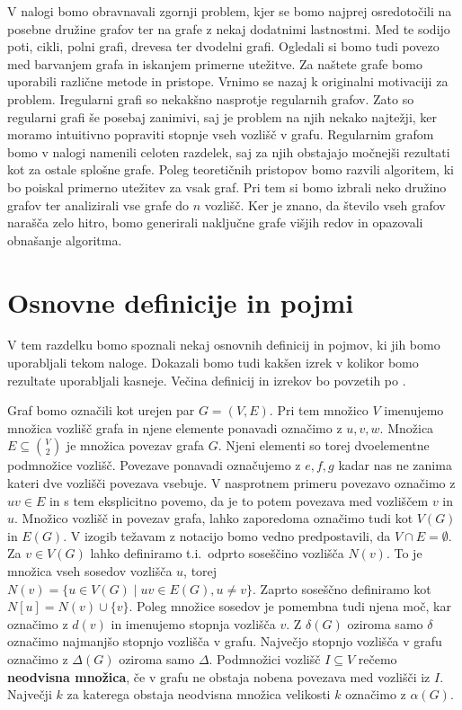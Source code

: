 \documentclass[12pt,a4paper,twoside]{article}
\theoremstyle{definition} %
\theoremstyle{plain} %
\numberwithin{equation}{section}  %
\begin{document}
V nalogi bomo obravnavali zgornji problem, kjer se bomo najprej osredotočili na posebne družine grafov ter na grafe z nekaj dodatnimi lastnostmi. Med te sodijo poti, cikli, polni grafi, drevesa ter dvodelni grafi. Ogledali si bomo tudi povezo med barvanjem grafa in iskanjem primerne utežitve. Za naštete grafe bomo uporabili različne metode in pristope. Vrnimo se nazaj k originalni motivaciji za problem. Iregularni grafi so nekakšno nasprotje regularnih grafov. Zato so regularni grafi še posebaj zanimivi, saj je problem na njih nekako najtežji, ker moramo intuitivno popraviti stopnje vseh vozlišč v grafu. Regularnim grafom bomo v nalogi namenili celoten razdelek, saj za njih obstajajo močnejši rezultati kot za ostale splošne grafe. Poleg teoretičnih pristopov bomo razvili algoritem, ki bo poiskal primerno utežitev za vsak graf. Pri tem si bomo izbrali neko družino grafov ter analizirali vse grafe do $n$ vozlišč. Ker je znano, da število vseh grafov narašča zelo hitro, bomo generirali naključne grafe višjih redov in opazovali obnašanje algoritma.



\section{Osnovne definicije in pojmi}

V tem razdelku bomo spoznali nekaj osnovnih definicij in pojmov, ki jih bomo uporabljali tekom naloge. Dokazali bomo tudi kakšen izrek v kolikor bomo rezultate uporabljali kasneje. Večina definicij in izrekov bo povzetih po \cite{maingraph}.

Graf bomo označili kot urejen par $G=(V, E)$. Pri tem množico $V$ imenujemo množica vozlišč grafa in njene elemente ponavadi označimo z $u, v, w$. Množica $E \subseteq {V \choose 2} $ je množica povezav grafa $G$. Njeni elementi so torej dvoelementne podmnožice vozlišč. Povezave ponavadi označujemo z $e, f, g$ kadar nas ne zanima kateri dve vozlišči povezava vsebuje. V nasprotnem primeru povezavo označimo z $uv \in E$ in s tem eksplicitno povemo, da je to potem povezava med vozliščem $v$ in $u$. Množico vozlišč in povezav grafa, lahko zaporedoma označimo tudi kot $V(G)$ in $E(G)$. V izogib težavam z notacijo bomo vedno predpostavili, da $V \cap E = \emptyset$. 
Za $v \in V(G)$ lahko definiramo t.i.\ odprto soseščino vozlišča $N(v)$. To je množica vseh sosedov vozlišča $u$, torej $N(v) = \{u \in V(G) \mid uv \in E(G), u \neq v \}$. Zaprto soseščno definiramo kot $N\left[u\right] = N(v) \cup \{v\}$. Poleg množice sosedov je pomembna tudi njena moč, kar označimo z $d(v)$ in imenujemo stopnja vozlišča $v$. Z $\delta(G)$ oziroma samo $\delta$ označimo najmanjšo stopnjo vozlišča v grafu. Največjo stopnjo vozlišča v grafu označimo z $\Delta(G)$ oziroma samo $\Delta$. Podmnožici vozlišč $I \subseteq V$ rečemo \textbf{neodvisna množica}, če v grafu ne obstaja nobena povezava med vozlišči iz $I$. Največji $k$ za katerega obstaja neodvisna množica velikosti $k$ označimo z $\alpha(G)$.
\end{document}

